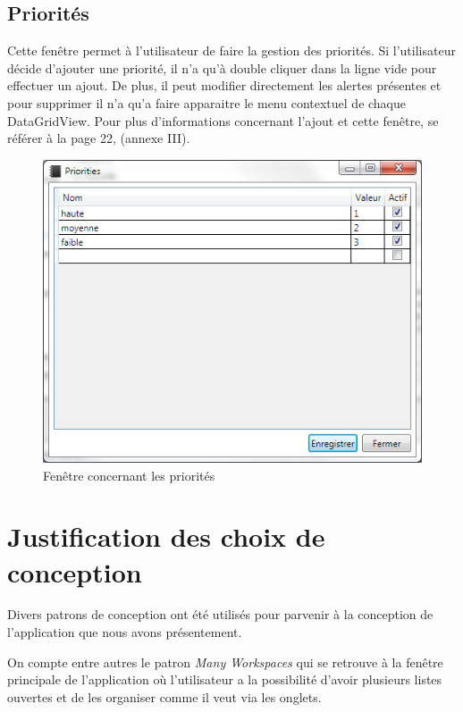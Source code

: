 \documentclass[letterpaper, oneside, 12pt, these, creativecommons]{thETS}
\begin{document}
\newpage

\subsection{Priorités}

Cette fenêtre permet à l'utilisateur de faire la gestion des priorités.  Si l'utilisateur décide d'ajouter une priorité, il n'a qu'à double cliquer dans la ligne vide pour effectuer un ajout. De plus, il peut modifier directement les alertes présentes et pour supprimer il n'a qu'a faire apparaitre le menu contextuel de chaque DataGridView. Pour plus d'informations concernant l'ajout et cette fenêtre, se référer à la page 22, (annexe III).

\begin{figure}[H!]
	\centering
	\includegraphics[width=1\textwidth]{fenetre_priorite.png}
	\caption{Fenêtre concernant les priorités}
\end{figure}

\newpage

\section{Justification des choix de conception}

Divers patrons de conception ont été utilisés pour parvenir à la conception de l'application que nous avons présentement. 

On compte entre autres le patron \emph{Many Workspaces} qui se retrouve à la fenêtre principale de l'application où l'utilisateur a la possibilité d'avoir plusieurs listes ouvertes et de les organiser comme il veut via les onglets.
\end{document}
